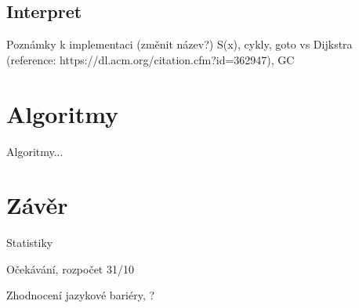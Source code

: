 \documentclass[13pt]{beamer}
\begin{document}
\subsection{Interpret}

\begin{frame}{Poznámky k implementaci (změnit název?)}
S(x), cykly, goto vs Dijkstra (reference: https://dl.acm.org/citation.cfm?id=362947), GC
\end{frame}

\section{Algoritmy}

\begin{frame}{Algoritmy...}
\end{frame}

\section{Závěr}

\begin{frame}{Statistiky}
\end{frame}

\begin{frame}{Očekávání, rozpočet}
31/10
\end{frame}

\begin{frame}{Zhodnocení}
jazykové bariéry, ?
\end{frame}
\end{document}
